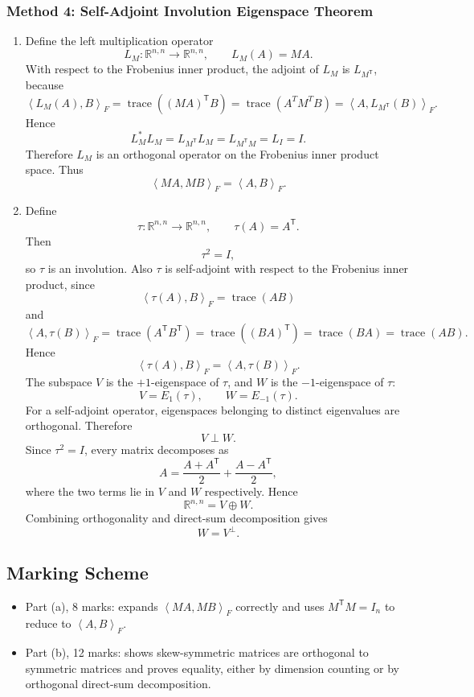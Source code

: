 \documentclass[12pt]{article}
\newcommand{\R}{\mathbb{R}}
\newcommand{\tr}{\operatorname{trace}}
\newcommand{\ipF}[2]{\left\langle #1,#2\right\rangle_F}
\newcommand{\T}{\mathsf{T}}
\begin{document}
\subsubsection{Method 4: Self-Adjoint Involution Eigenspace Theorem}
\begin{enumerate}[label=(\alph*)]
  \item Define the left multiplication operator
  \[
    L_M:\R^{n,n}\to\R^{n,n},
    \qquad
    L_M(A)=MA.
  \]
  With respect to the Frobenius inner product, the adjoint of $L_M$ is $L_{M^\T}$, because
  \[
    \ipF{L_M(A)}{B}=\tr((MA)^\T B)=\tr(A^T M^T B)=\ipF{A}{L_{M^\T}(B)}.
  \]
  Hence
  \[
    L_M^*L_M=L_{M^\T}L_M=L_{M^\T M}=L_I=I.
  \]
  Therefore $L_M$ is an orthogonal operator on the Frobenius inner product space. Thus
  \[
    \boxed{\ipF{MA}{MB}=\ipF{A}{B}.}
  \]

  \item Define
  \[
    \tau:\R^{n,n}\to\R^{n,n},
    \qquad
    \tau(A)=A^\T.
  \]
  Then
  \[
    \tau^2=I,
  \]
  so $\tau$ is an involution. Also $\tau$ is self-adjoint with respect to the Frobenius inner product, since
  \[
    \ipF{\tau(A)}{B}=\tr(A B)
  \]
  and
  \[
    \ipF{A}{\tau(B)}=\tr(A^\T B^\T)=\tr((BA)^\T)=\tr(BA)=\tr(AB).
  \]
  Hence
  \[
    \ipF{\tau(A)}{B}=\ipF{A}{\tau(B)}.
  \]
  The subspace $V$ is the $+1$-eigenspace of $\tau$, and $W$ is the $-1$-eigenspace of $\tau$:
  \[
    V=E_1(\tau),
    \qquad
    W=E_{-1}(\tau).
  \]
  For a self-adjoint operator, eigenspaces belonging to distinct eigenvalues are orthogonal. Therefore
  \[
    V\perp W.
  \]
  Since $\tau^2=I$, every matrix decomposes as
  \[
    A=\frac{A+A^\T}{2}+\frac{A-A^\T}{2},
  \]
  where the two terms lie in $V$ and $W$ respectively. Hence
  \[
    \R^{n,n}=V\oplus W.
  \]
  Combining orthogonality and direct-sum decomposition gives
  \[
    \boxed{W=V^\perp.}
  \]
\end{enumerate}

\newpage
\subsection{Marking Scheme}
\begin{itemize}[leftmargin=*]
  \item Part (a), 8 marks: expands $\ipF{MA}{MB}$ correctly and uses $M^\T M=I_n$ to reduce to $\ipF{A}{B}$.
  \item Part (b), 12 marks: shows skew-symmetric matrices are orthogonal to symmetric matrices and proves equality, either by dimension counting or by orthogonal direct-sum decomposition.
\end{itemize}
\end{document}
